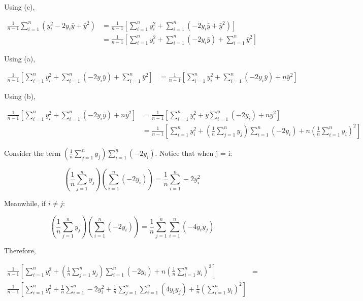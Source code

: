 \documentclass[12pt]{article}
\begin{document}
    Using (c),
    
    \begin{align*}
        \frac{1}{n-1} \sum_{i = 1}^n (y_i^2 - 2y_i \bar{y} + \bar{y}^2) &= \frac{1}{n-1} [\sum_{i = 1}^n y_i^2 + \sum_{i = 1}^n (-2y_i\bar{y} + \bar{y}^2)] \\
        &= \frac{1}{n-1} [\sum_{i = 1}^n y_i^2 + \sum_{i = 1}^n (-2y_i\bar{y}) + \sum_{i = 1}^n \bar{y}^2]
    \end{align*}
    
    Using (a),
    
    \begin{align*}
        \frac{1}{n-1} [\sum_{i = 1}^n y_i^2 + \sum_{i = 1}^n (-2y_i\bar{y}) + \sum_{i = 1}^n \bar{y}^2] &= \frac{1}{n-1} [\sum_{i = 1}^n y_i^2 + \sum_{i = 1}^n (-2y_i \bar{y}) + n \bar{y}^2]
    \end{align*}
    
    Using (b),
    
    \begin{align*}
        \frac{1}{n-1} [\sum_{i = 1}^n y_i^2 + \sum_{i = 1}^n (-2y_i \bar{y}) + n \bar{y}^2] &= \frac{1}{n-1} [\sum_{i = 1}^n y_i^2 + \bar{y} \sum_{i = 1}^n (-2y_i) + n \bar{y}^2 ] \\
        &= \frac{1}{n-1} \left[\sum_{i = 1}^n y_i^2 + \left(\frac{1}{n} \sum_{j = 1}^n y_j \right) \sum_{i = 1}^n (-2y_i) + n \left(\frac{1}{n} \sum_{i = 1}^n y_i \right)^2 \right]
    \end{align*}
    
    Consider the term $\left(\frac{1}{n} \sum_{j = 1}^n y_j \right) \sum_{i = 1}^n (-2y_i)$. Notice that when j = i:
    
    \[ \left(\frac{1}{n} \sum_{j = 1}^n y_j \right) \left( \sum_{i = 1}^n (-2y_i) \right) = \frac{1}{n} \sum_{i = 1}^n -2y_i^2 \]
    
    Meanwhile, if $i \neq j$:
    
    \[ \left(\frac{1}{n} \sum_{j = 1}^n y_j \right) \left( \sum_{i = 1}^n (-2y_i) \right) = \frac{1}{n} \sum_{j = 1}^n \sum_{i = 1}^n (-4y_iy_j) \]
    
    Therefore,
    
    \begin{align*}
        \frac{1}{n-1} \left[\sum_{i = 1}^n y_i^2 + \left(\frac{1}{n} \sum_{j = 1}^n y_j \right) \sum_{i = 1}^n (-2y_i) + n \left(\frac{1}{n} \sum_{i = 1}^n y_i \right)^2 \right] &= \\
        \frac{1}{n-1} \left[ \sum_{i = 1}^n y_i^2 + \frac{1}{n} \sum_{i = 1}^n -2y_i^2 + \frac{1}{n} \sum_{j = 1}^n \sum_{i = 1}^n (4 y_i y_j) + \frac{1}{n} \left( \sum_{i = 1}^n y_i \right)^2 \right]
    \end{align*}
    
\end{document}

